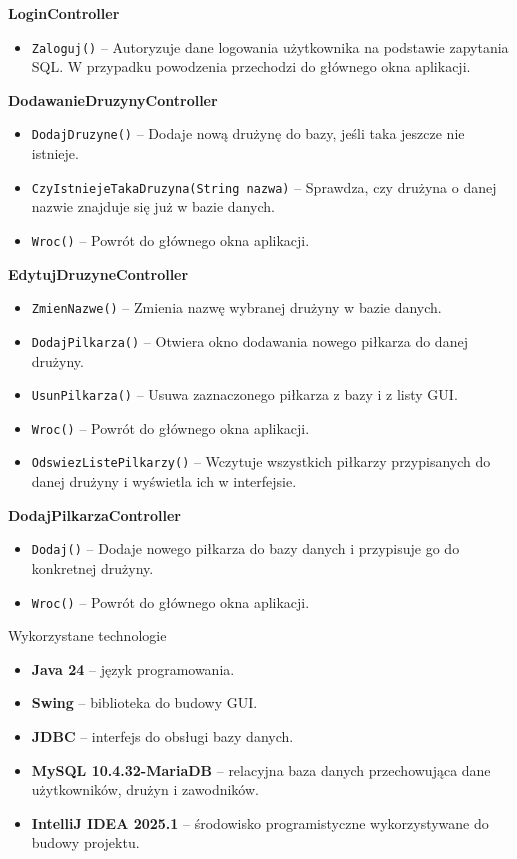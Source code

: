 \documentclass{urdpl}     %
\begin{document}
\textbf{LoginController}
\begin{itemize}
  \item \texttt{Zaloguj()} – Autoryzuje dane logowania użytkownika na podstawie zapytania SQL. W przypadku powodzenia przechodzi do głównego okna aplikacji.
\end{itemize}

\textbf{DodawanieDruzynyController}
\begin{itemize}
  \item \texttt{DodajDruzyne()} – Dodaje nową drużynę do bazy, jeśli taka jeszcze nie istnieje.
  \item \texttt{CzyIstniejeTakaDruzyna(String nazwa)} – Sprawdza, czy drużyna o danej nazwie znajduje się już w bazie danych.
  \item \texttt{Wroc()} – Powrót do głównego okna aplikacji.
\end{itemize}

\textbf{EdytujDruzyneController}
\begin{itemize}
  \item \texttt{ZmienNazwe()} – Zmienia nazwę wybranej drużyny w bazie danych.
  \item \texttt{DodajPilkarza()} – Otwiera okno dodawania nowego piłkarza do danej drużyny.
  \item \texttt{UsunPilkarza()} – Usuwa zaznaczonego piłkarza z bazy i z listy GUI.
  \item \texttt{Wroc()} – Powrót do głównego okna aplikacji.
  \item \texttt{OdswiezListePilkarzy()} – Wczytuje wszystkich piłkarzy przypisanych do danej drużyny i wyświetla ich w interfejsie.
\end{itemize}

\textbf{DodajPilkarzaController}
\begin{itemize}
  \item \texttt{Dodaj()} – Dodaje nowego piłkarza do bazy danych i przypisuje go do konkretnej drużyny.
  \item \texttt{Wroc()} – Powrót do głównego okna aplikacji.
\end{itemize}


Wykorzystane technologie

\begin{itemize}
  \item \textbf{Java 24} – język programowania.
  \item \textbf{Swing} – biblioteka do budowy GUI.
  \item \textbf{JDBC} – interfejs do obsługi bazy danych.
  \item \textbf{MySQL 10.4.32-MariaDB} – relacyjna baza danych przechowująca dane użytkowników, drużyn i zawodników.
  \item \textbf{IntelliJ IDEA 2025.1} – środowisko programistyczne wykorzystywane do budowy projektu.
\end{itemize}
\end{document}

